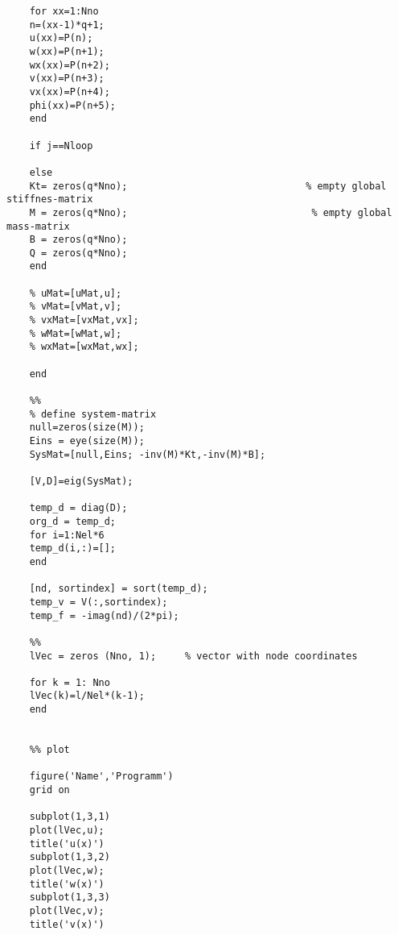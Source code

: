 \begin{lstlisting}
	for xx=1:Nno
	n=(xx-1)*q+1;
	u(xx)=P(n);
	w(xx)=P(n+1);
	wx(xx)=P(n+2);
	v(xx)=P(n+3);
	vx(xx)=P(n+4);
	phi(xx)=P(n+5);
	end
	
	if j==Nloop
	
	else
	Kt= zeros(q*Nno);                               % empty global stiffnes-matrix 
	M = zeros(q*Nno);                                % empty global mass-matrix 
	B = zeros(q*Nno);   
	Q = zeros(q*Nno);
	end
	
	% uMat=[uMat,u];
	% vMat=[vMat,v];
	% vxMat=[vxMat,vx];
	% wMat=[wMat,w];
	% wxMat=[wxMat,wx];
	
	end
	
	%%
	% define system-matrix
	null=zeros(size(M));
	Eins = eye(size(M));
	SysMat=[null,Eins; -inv(M)*Kt,-inv(M)*B];
	
	[V,D]=eig(SysMat);
	
	temp_d = diag(D);
	org_d = temp_d;
	for i=1:Nel*6
	temp_d(i,:)=[];
	end
	
	[nd, sortindex] = sort(temp_d);
	temp_v = V(:,sortindex);
	temp_f = -imag(nd)/(2*pi);
	
	%%
	lVec = zeros (Nno, 1);     % vector with node coordinates
	
	for k = 1: Nno
	lVec(k)=l/Nel*(k-1);
	end
	
	
	%% plot
	
	figure('Name','Programm')
	grid on
	
	subplot(1,3,1)
	plot(lVec,u);
	title('u(x)')
	subplot(1,3,2)
	plot(lVec,w);
	title('w(x)')
	subplot(1,3,3)
	plot(lVec,v);
	title('v(x)')
	\end{lstlisting}
	
